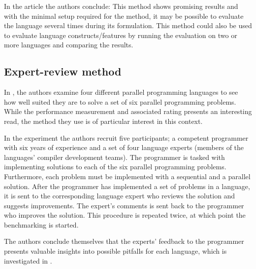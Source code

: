In the article the authors conclude:
This method shows promising results and with the minimal setup required for the method, it may be possible to evaluate the language several times during its formulation.
This method could also be used to evaluate language constructs/features by running the evaluation on two or more languages and comparing the results.

\subsection{Expert-review method}
In \cite{nanz2013benchmarking}, the authors examine four different parallel programming languages to see how well suited they are to solve a set of six parallel programming problems. While the performance measurement and associated rating presents an interesting read, the method they use is of particular interest in this context. 

In the experiment the authors recruit five participants; a competent programmer with six years of experience and a set of four language experts (members of the languages' compiler development teams). The programmer is tasked with implementing solutions to each of the six parallel programming problems. Furthermore, each problem must be implemented with a sequential and a parallel solution. After the programmer has implemented a set of problems in a language, it is sent to the corresponding language expert who reviews the solution and suggests improvements. The expert's comments is sent back to the programmer who improves the solution. This procedure is repeated twice, at which point the benchmarking is started.

The authors conclude themselves that the experts' feedback to the programmer presents valuable insights into possible pitfalls for each language, which is investigated in \cite{nanz2013examining}. %

